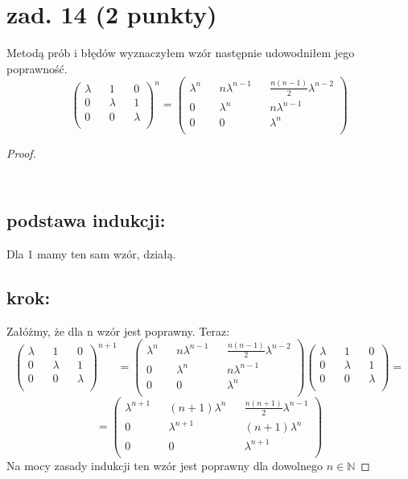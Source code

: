 \documentclass{article}
\begin{document}
\section{zad. 14 (2 punkty)}
Metodą prób i błędów wyznaczyłem wzór następnie udowodniłem jego poprawność.
$$
\begin{pmatrix}
\lambda && 1 && 0\\
0 && \lambda && 1\\
0 && 0 && \lambda\\
\end{pmatrix}^n
=
\begin{pmatrix}
\lambda^n && n\lambda^{n-1} && \frac{n(n-1)}{2}\lambda^{n-2}\\
0 && \lambda^n && n\lambda^{n-1}\\
0 && 0 && \lambda^n\\
\end{pmatrix}
$$
\begin{proof}
\subsection*{\\podstawa indukcji:}
Dla 1 mamy ten sam wzór, działą.
\subsection*{krok:}
Załóżmy, że dla n wzór jest poprawny. Teraz:
$$
\begin{pmatrix}
\lambda && 1 && 0\\
0 && \lambda && 1\\
0 && 0 && \lambda\\
\end{pmatrix}^{n+1}
=
\begin{pmatrix}
\lambda^n && n\lambda^{n-1} && \frac{n(n-1)}{2}\lambda^{n-2}\\
0 && \lambda^n && n\lambda^{n-1}\\
0 && 0 && \lambda^n\\
\end{pmatrix}
\begin{pmatrix}
\lambda && 1 && 0\\
0 && \lambda && 1\\
0 && 0 && \lambda\\
\end{pmatrix}
=
$$
$$
=\begin{pmatrix}
\lambda^{n+1} && (n+1)\lambda^{n} && \frac{n(n+1)}{2}\lambda^{n-1}\\
0 && \lambda^{n+1} && (n+1)\lambda^{n}\\
0 && 0 && \lambda^{n+1}\\
\end{pmatrix}
$$
Na mocy zasady indukcji ten wzór jest poprawny dla dowolnego $n \in \mathbb{N}$
\end{proof}
\end{document}
